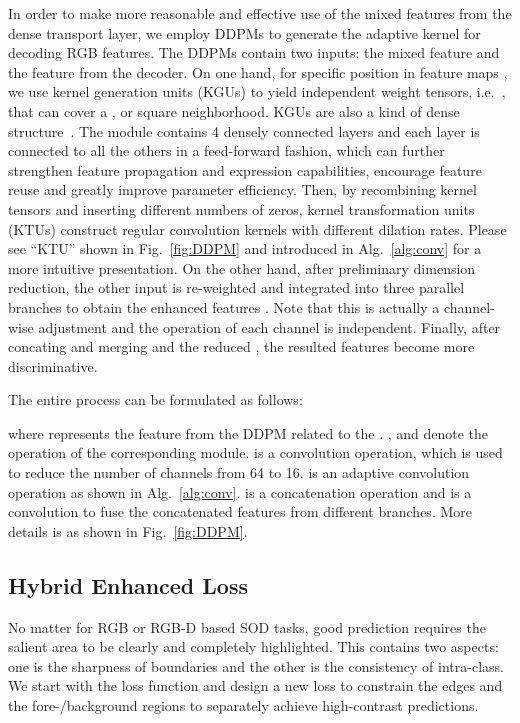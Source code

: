 \documentclass[runningheads]{llncs}
\begin{document}
In order to make more reasonable and effective use of the mixed features  from the dense transport layer, we employ DDPMs to generate the adaptive kernel for decoding RGB features. The DDPMs contain two inputs: the mixed feature  and the feature  from the decoder.
On one hand, for specific position in feature maps , we use kernel generation units (KGUs) to yield independent weight tensors, i.e.\ , that can cover a ,  or  square neighborhood. KGUs are also a kind of dense structure~\cite{DenseNet}. The module contains 4 densely connected layers and each layer is connected to all the others in a feed-forward fashion, which can further strengthen feature propagation and expression capabilities, encourage feature reuse and greatly improve parameter efficiency. Then, by recombining kernel tensors and inserting different numbers of zeros, kernel transformation units (KTUs) construct regular convolution kernels with different dilation rates. Please see ``KTU'' shown in Fig.~\ref{fig:DDPM}
and introduced in Alg.~\ref{alg:conv} for a more intuitive presentation.
On the other hand, after preliminary dimension reduction, the other input  is re-weighted and integrated into three parallel branches to obtain the enhanced features . Note that this is actually a channel-wise adjustment and the operation of each channel is independent.
Finally, after concating and merging  and the reduced , the resulted features  become more discriminative.

The entire process can be formulated as follows:

\noindent where  represents the feature from the DDPM related to the .
,  and  denote the operation of the corresponding module.
 is a  convolution operation, which is used to reduce the number of channels from 64 to 16.  is an adaptive convolution operation as shown in Alg.~\ref{alg:conv}.
 is a concatenation operation and  is a  convolution to fuse the concatenated features from different branches. More details is as shown in Fig.~\ref{fig:DDPM}.

\subsection{Hybrid Enhanced Loss}

No matter for RGB or RGB-D based SOD tasks, good prediction requires the salient area to be clearly and completely highlighted. This contains two aspects: one is the sharpness of boundaries and the other is the consistency of intra-class.
We start with the loss function and design a new loss to constrain the edges and the fore-/background regions to separately achieve high-contrast predictions.
\end{document}
